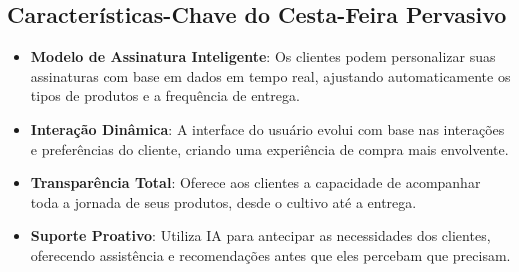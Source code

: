 \documentclass{article}
\begin{document}
\subsection{Características-Chave do Cesta-Feira Pervasivo}
\begin{itemize}
    \item \textbf{Modelo de Assinatura Inteligente}: Os clientes podem personalizar suas assinaturas com base em dados em tempo real, ajustando automaticamente os tipos de produtos e a frequência de entrega.
    \item \textbf{Interação Dinâmica}: A interface do usuário evolui com base nas interações e preferências do cliente, criando uma experiência de compra mais envolvente.
    \item \textbf{Transparência Total}: Oferece aos clientes a capacidade de acompanhar toda a jornada de seus produtos, desde o cultivo até a entrega.
    \item \textbf{Suporte Proativo}: Utiliza IA para antecipar as necessidades dos clientes, oferecendo assistência e recomendações antes que eles percebam que precisam.
\end{itemize}
\end{document}
